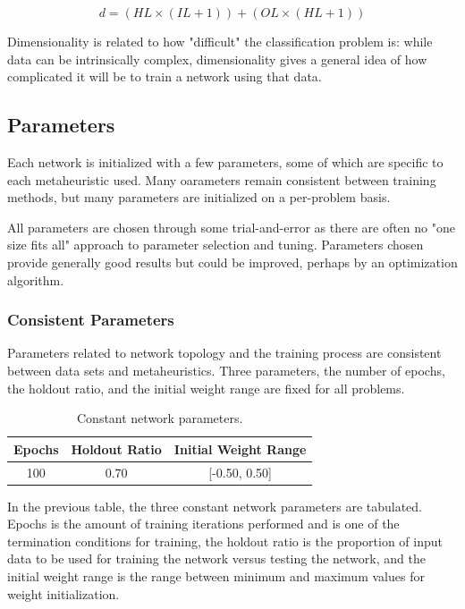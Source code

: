\documentclass[a4paper,12pt]{article}
\begin{document}
$$d = (HL \times (IL + 1)) + (OL \times (HL + 1))$$

Dimensionality is related to how "difficult" the classification problem is: while data can be intrinsically complex, dimensionality gives a general idea of how complicated it will be to train a network using that data.

\subsection{Parameters}

Each network is initialized with a few parameters, some of which are specific to each metaheuristic used. Many oarameters remain consistent between training methods, but many parameters are initialized on a per-problem basis.

All parameters are chosen through some trial-and-error as there are often no "one size fits all" approach to parameter selection and tuning. Parameters chosen provide generally good results but could be improved, perhaps by an optimization algorithm.

\subsubsection{Consistent Parameters}

Parameters related to network topology and the training process are consistent between data sets and metaheuristics. Three parameters, the number of epochs, the holdout ratio, and the initial weight range are fixed for all problems.

\begin{table}[h!]
\centering
\begin{tabular}{|c|c|c|}
\hline
\textbf{Epochs} & \textbf{Holdout Ratio} & \textbf{Initial Weight Range} \\ \hline
100 & 0.70 & {[}-0.50, 0.50{]} \\ \hline
\end{tabular}
\caption{Constant network parameters.}
\label{Tab:const-par}
\end{table}

In the previous table, the three constant network parameters are tabulated. Epochs is the amount of training iterations performed and is one of the termination conditions for training, the holdout ratio is the proportion of input data to be used for training the network versus testing the network, and the initial weight range is the range between minimum and maximum values for weight initialization.
\end{document}
